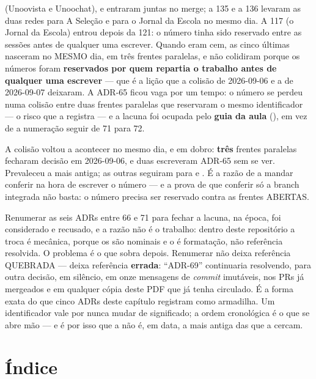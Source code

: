 (Unoovista e Unoochat), e entraram juntas no merge; a 135 e a 136 levaram as
duas redes para A Seleção e para o Jornal da Escola no mesmo dia. A 117
(o Jornal da Escola) entrou depois da 121: o número tinha sido
reservado entre as sessões antes de qualquer uma escrever. Quando
eram cem, as cinco últimas nasceram no MESMO dia, em três frentes paralelas, e não
colidiram porque os números foram \textbf{reservados por quem repartia o
trabalho antes de qualquer uma escrever} --- que é a lição que a colisão de
2026-09-06 e a de 2026-09-07 deixaram. A ADR-65
ficou vaga por um tempo: o número se perdeu numa colisão entre duas frentes
paralelas que reservaram o mesmo identificador --- o risco que a 
registra --- e a lacuna foi ocupada pelo \textbf{guia da aula} (),
em vez de a numeração seguir de 71 para 72.

A colisão voltou a acontecer no mesmo dia, e em dobro: \textbf{três} frentes
paralelas fecharam decisão em 2026-09-06, e duas escreveram ADR-65 sem se ver.
Prevaleceu a mais antiga; as outras seguiram para  e
. É a razão de a  mandar conferir  na
hora de escrever o número --- e a prova de que conferir só a branch integrada
não basta: o número precisa ser reservado contra as frentes ABERTAS.

Renumerar as seis ADRs entre 66 e 71 para fechar a lacuna, na época, foi
considerado e recusado, e a razão não é o trabalho: dentro deste repositório a
troca é mecânica, porque os  são nominais e o
 é formatação, não referência resolvida. O problema é o
que sobra depois. Renumerar não deixa referência QUEBRADA --- deixa referência
\textbf{errada}: \enquote{ADR-69} continuaria resolvendo, para outra decisão, em
silêncio, em onze mensagens de \emph{commit} imutáveis, nos PRs já mergeados e em
qualquer cópia deste PDF que já tenha circulado. É a forma exata do
 que cinco ADRs deste capítulo registram como armadilha. Um
identificador vale por nunca mudar de significado; a ordem cronológica é o que se
abre mão --- e é por isso que a  não é, em data, a mais antiga das
que a cercam.

\section{Índice}

